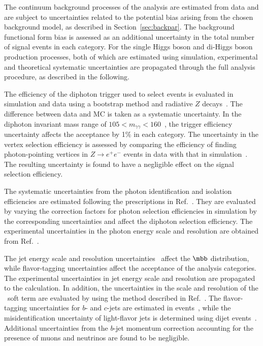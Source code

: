 \documentclass[PAPER, cernpreprint, texlive=2016, paper=a4, USenglish, texmf]{atlasdoc}
\begin{document}
 
 
 
The continuum background processes of the analysis are estimated from data and are subject to uncertainties related to the potential bias arising from the chosen background model, as described in Section~\ref{sec:backpar}. The background functional form bias is assessed as an additional uncertainty in the total number of signal events in each category.
For the single Higgs boson and di-Higgs boson production processes, both of which are estimated using simulation, experimental and theoretical systematic uncertainties are propagated through the full analysis procedure, as described in the following.
 
The efficiency of the diphoton trigger used to select events is evaluated in simulation and data using a bootstrap method and radiative $Z$ decays~\cite{TRIG-2018-05}. The difference between data and MC is taken as a systematic uncertainty.
In the diphoton invariant mass range of $105 < m_{\gamma\gamma} < 160$~\GeV, the trigger efficiency uncertainty affects the acceptance by 1\% in each category. The uncertainty in the vertex selection efficiency is assessed by comparing the efficiency of finding photon-pointing vertices in $Z \rightarrow e^+e^-$ events in data with that in simulation~\cite{HIGG-2016-08}. The resulting uncertainty is found to have a negligible effect on the signal selection efficiency.
 
 
The systematic uncertainties from the photon identification and isolation efficiencies are estimated following the prescriptions in Ref.~\cite{EGAM-2018-01}. They are evaluated by varying the correction factors for photon selection efficiencies in simulation by the corresponding uncertainties and affect the diphoton selection efficiency.
The experimental uncertainties in the photon energy scale and resolution are obtained from Ref.~\cite{EGAM-2018-01}.
 
The jet energy scale and resolution uncertainties~\cite{JETM-2018-05} affect the $\mbb$ distribution, while flavor-tagging uncertainties affect the acceptance of the analysis categories. The experimental uncertainties in jet energy scale and resolution are propagated to the \etmiss calculation. In addition, the uncertainties in the scale and resolution of the \etmiss\ soft term are evaluated by using the method described in Ref.~\cite{PERF-2016-07}.
The flavor-tagging uncertainties for $b$- and $c$-jets are estimated in \ttbar{} events~\cite{FTAG-2018-01,ATLAS-CONF-2018-001}, while the misidentification uncertainty of light-flavor jets is determined using dijet events~\cite{ATLAS-CONF-2018-006}.
Additional uncertainties from the $b$-jet momentum correction accounting for the presence of muons and neutrinos are found to be negligible.
 
\end{document}
